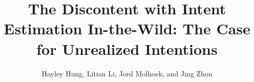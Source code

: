 \documentclass[sigconf]{acmart}
\begin{document}


\title{The Discontent with Intent Estimation In-the-Wild: The Case for Unrealized Intentions}

\author{Hayley Hung, Litian Li,  Jord Molhoek, and  Jing Zhou}











\end{document}
